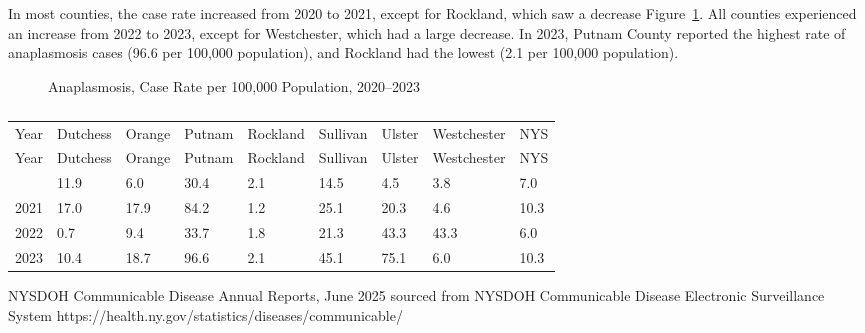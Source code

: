 \documentclass[
  english,
  letterpaper,
]{report}
\begin{document}
In most counties, the case rate increased from 2020 to 2021, except for
Rockland, which saw a decrease Figure~\ref{fig-anaplasmosis}. All
counties experienced an increase from 2022 to 2023, except for
Westchester, which had a large decrease. In 2023, Putnam County reported
the highest rate of anaplasmosis cases (96.6 per 100,000 population),
and Rockland had the lowest (2.1 per 100,000 population).

\begin{figure}


\caption{\label{fig-anaplasmosis}Anaplasmosis, Case Rate per 100,000
Population, 2020--2023}

\end{figure}%

\begin{longtable}[]{@{}lllllllll@{}}

\caption{\label{tbl-anaplasmosis}Anaplasmosis, Case Rate per 100,000
Population, 2020--2023}

\tabularnewline

\caption{}\label{T_2eb7b}\tabularnewline
\toprule\noalign{}
Year & Dutchess & Orange & Putnam & Rockland & Sullivan & Ulster &
Westchester & NYS \\
\midrule\noalign{}
\endfirsthead
\toprule\noalign{}
Year & Dutchess & Orange & Putnam & Rockland & Sullivan & Ulster &
Westchester & NYS \\
\midrule\noalign{}
\endhead
\bottomrule\noalign{}
\endlastfoot
2020 & 11.9 & 6.0 & 30.4 & 2.1 & 14.5 & 4.5 & 3.8 & 7.0 \\
2021 & 17.0 & 17.9 & 84.2 & 1.2 & 25.1 & 20.3 & 4.6 & 10.3 \\
2022 & 0.7 & 9.4 & 33.7 & 1.8 & 21.3 & 43.3 & 43.3 & 6.0 \\
2023 & 10.4 & 18.7 & 96.6 & 2.1 & 45.1 & 75.1 & 6.0 & 10.3 \\

\end{longtable}

\begin{tcolorbox}[enhanced jigsaw, breakable, leftrule=.75mm, title=\textcolor{quarto-callout-note-color}{\faInfo}\hspace{0.5em}{Source}, bottomrule=.15mm, opacityback=0, left=2mm, colback=white, bottomtitle=1mm, coltitle=black, colbacktitle=quarto-callout-note-color!10!white, colframe=quarto-callout-note-color-frame, opacitybacktitle=0.6, toptitle=1mm, titlerule=0mm, arc=.35mm, rightrule=.15mm, toprule=.15mm]

NYSDOH Communicable Disease Annual Reports, June 2025 sourced from
NYSDOH Communicable Disease Electronic Surveillance System
https://health.ny.gov/statistics/diseases/communicable/

\end{tcolorbox}
\end{document}
